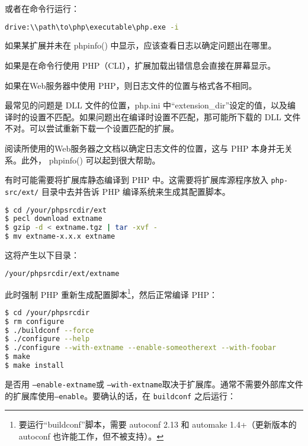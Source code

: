 \begin{compactitem}
或者在命令行运行：

\begin{lstlisting}[language=bash]
drive:\\path\to\php\executable\php.exe -i
\end{lstlisting}

如果某扩展并未在 phpinfo() 中显示，应该查看日志以确定问题出在哪里。

\begin{compactitem}
\item 如果是在命令行使用 PHP（CLI），扩展加载出错信息会直接在屏幕显示。
\item 如果在Web服务器中使用 PHP，则日志文件的位置与格式各不相同。
\end{compactitem}

最常见的问题是 DLL 文件的位置，php.ini 中“extension\_dir”设定的值，以及编译时的设置不匹配。如果问题出在编译时设置不匹配，那可能所下载的 DLL 文件不对。可以尝试重新下载一个设置匹配的扩展。

阅读所使用的Web服务器之文档以确定日志文件的位置，这与 PHP 本身并无关系。此外， phpinfo() 可以起到很大帮助。



\end{compactitem}


有时可能需要将扩展库静态编译到 PHP 中。这需要将扩展库源程序放入 \texttt{php-src/ext/} 目录中去并告诉 PHP 编译系统来生成其配置脚本。


\begin{lstlisting}[language=bash]
$ cd /your/phpsrcdir/ext
$ pecl download extname
$ gzip -d < extname.tgz | tar -xvf -
$ mv extname-x.x.x extname
\end{lstlisting}

这将产生以下目录：

\begin{lstlisting}[language=bash]
/your/phpsrcdir/ext/extname
\end{lstlisting}

此时强制 PHP 重新生成配置脚本\footnote{要运行“buildconf”脚本，需要 autoconf 2.13 和 automake 1.4+（更新版本的 autoconf 也许能工作，但不被支持）。}，然后正常编译 PHP：

\begin{lstlisting}[language=bash]
$ cd /your/phpsrcdir 
$ rm configure
$ ./buildconf --force
$ ./configure --help
$ ./configure --with-extname --enable-someotherext --with-foobar
$ make
$ make install
\end{lstlisting}


是否用 \texttt{--enable-extname}或 \texttt{--with-extname}取决于扩展库。通常不需要外部库文件的扩展库使用\texttt{--enable}。要确认的话，在 \texttt{buildconf} 之后运行：

